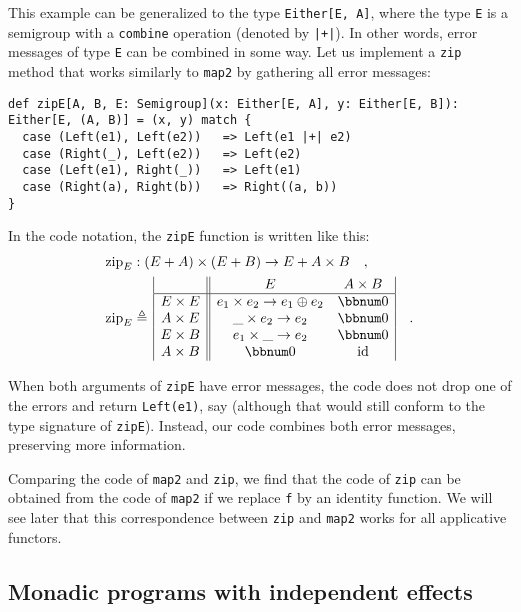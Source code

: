 This example can be generalized to the type \lstinline!Either[E, A]!,
where the type \lstinline!E! is a semigroup with a \lstinline!combine!
operation (denoted by \lstinline!|+|!). In other words, error messages
of type \lstinline!E! can be combined in some way. Let us implement
a \lstinline!zip! method that works similarly to \lstinline!map2!
by gathering all error messages:
\begin{lstlisting}
def zipE[A, B, E: Semigroup](x: Either[E, A], y: Either[E, B]): Either[E, (A, B)] = (x, y) match {
  case (Left(e1), Left(e2))   => Left(e1 |+| e2)
  case (Right(_), Left(e2))   => Left(e2)
  case (Left(e1), Right(_))   => Left(e1)
  case (Right(a), Right(b))   => Right((a, b))
}
\end{lstlisting}
In the code notation, the \lstinline!zipE! function is written like
this:
\begin{align*}
 & \text{zip}_{E}:(E+A)\times(E+B)\rightarrow E+A\times B\quad,\\
 & \text{zip}_{E}\triangleq\,\begin{array}{|c||cc|}
 & E & A\times B\\
\hline E\times E & e_{1}\times e_{2}\rightarrow e_{1}\oplus e_{2} & \bbnum 0\\
A\times E & \_\times e_{2}\rightarrow e_{2} & \bbnum 0\\
E\times B & e_{1}\times\_\rightarrow e_{2} & \bbnum 0\\
A\times B & \bbnum 0 & \text{id}
\end{array}\quad.
\end{align*}

When both arguments of \lstinline!zipE! have error messages, the
code does not drop one of the errors and return \lstinline!Left(e1)!,
say (although that would still conform to the type signature of \lstinline!zipE!).
Instead, our code combines both error messages, preserving more information.

Comparing the code of \lstinline!map2! and \lstinline!zip!, we find
that the code of \lstinline!zip! can be obtained from the code of
\lstinline!map2! if we replace \lstinline!f! by an identity function.
We will see later that this correspondence between \lstinline!zip!
and \lstinline!map2! works for all applicative functors.

\subsection{Monadic programs with independent effects\label{subsec:Monadic-programs-with-independent-effects-future-applicative}}

